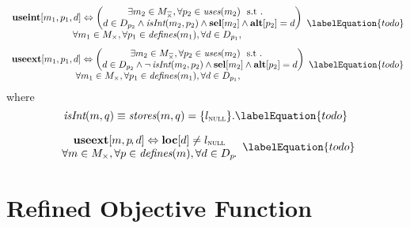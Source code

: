 \begin{equation}
  \begin{array}{c}
    \mVar{useint}[m_1, p_1, d]
    \mEq
    \left(
    \begin{array}{@{}c@{}}
      \exists m_2 \in \mKillMatchCompSet,
      \forall p_2 \in \mUses(m_2) \text{ \st} \\
      d \in \mDataSet[p_2] \mAnd \mIsInt(m_2, p_2)
      \mAnd
      \mVar{sel}[m_2]
      \mAnd
      \mVar{alt}[p_2] = d
    \end{array}
    \right) \\
    \forall m_1 \in \mKillMatchSet,
    \forall p_1 \in \mDefines(m_1),
    \forall d \in \mDataSet[p_1],
  \end{array}
  \labelEquation{todo}
\end{equation}
%
\begin{equation}
  \begin{array}{c}
    \mVar{useext}[m_1, p_1, d]
    \mEq
    \left(
    \begin{array}{@{}c@{}}
      \exists m_2 \in \mKillMatchCompSet,
      \forall p_2 \in \mUses(m_2) \text{ \st} \\
      d \in \mDataSet[p_2] \mAnd \neg\mIsInt(m_2, p_2)
      \mAnd
      \mVar{sel}[m_2]
      \mAnd
      \mVar{alt}[p_2] = d
    \end{array}
    \right) \\
    \forall m_1 \in \mKillMatchSet,
    \forall p_1 \in \mDefines(m_1),
    \forall d \in \mDataSet[p_1],
  \end{array}
  \labelEquation{todo}
\end{equation}
%
where
%
\begin{equation}
  \mIsInt(m, q) \equiv \mStores(m, q) = \mSet{\mNullLocation}.
  \labelEquation{todo}
\end{equation}

\begin{equation}
  \begin{array}{c}
    \mVar{useext}[m, p \hspace{-1pt}, d]
    \mEq
    \mVar{loc}[d] \neq \mNullLocation \\
    \forall m \in \mKillMatchSet,
    \forall p \in \mDefines(m),
    \forall d \in \mDataSet[p] \hspace{-1pt}.
  \end{array}
  \labelEquation{todo}
\end{equation}


\section{Refined Objective Function}

